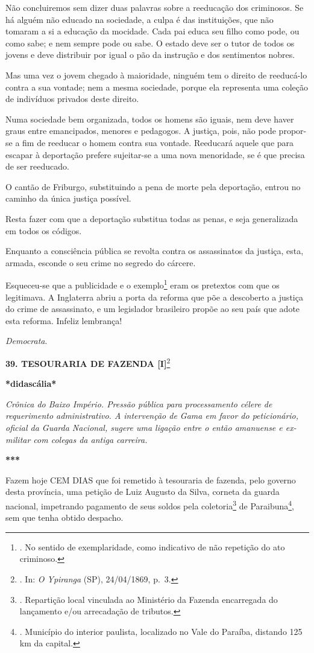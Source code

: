 Não concluiremos sem dizer duas palavras sobre a reeducação dos
criminosos. Se há alguém não educado na sociedade, a culpa é das
instituições, que não tomaram a si a educação da mocidade. Cada pai
educa seu filho como pode, ou como sabe; e nem sempre pode ou sabe. O
estado deve ser o tutor de todos os jovens e deve distribuir por igual o
pão da instrução e dos sentimentos nobres.

Mas uma vez o jovem chegado à maioridade, ninguém tem o direito de
reeducá-lo contra a sua vontade; nem a mesma sociedade, porque ela
representa uma coleção de indivíduos privados deste direito.

Numa sociedade bem organizada, todos os homens são iguais, nem deve
haver graus entre emancipados, menores e pedagogos. A justiça, pois, não
pode propor-se a fim de reeducar o homem contra sua vontade. Reeducará
aquele que para escapar à deportação prefere sujeitar-se a uma nova
menoridade, se é que precisa de ser reeducado.

O cantão de Friburgo, substituindo a pena de morte pela deportação,
entrou no caminho da única justiça possível.

Resta fazer com que a deportação substitua todas as penas, e seja
generalizada em todos os códigos.

Enquanto a consciência pública se revolta contra os assassinatos da
justiça, esta, armada, esconde o seu crime no segredo do cárcere.

Esqueceu-se que a publicidade e o exemplo\footnote{. No sentido de
  exemplaridade, como indicativo de não repetição do ato criminoso.}
eram os pretextos com que os legitimava. A Inglaterra abriu a porta da
reforma que põe a descoberto a justiça do crime de assassinato, e um
legislador brasileiro propõe ao seu país que adote esta reforma. Infeliz
lembrança!

\emph{Democrata}.

\textbf{39. TESOURARIA DE FAZENDA {[}I{]}}\footnote{. In: \emph{O
  Ypiranga} (SP), 24/04/1869, p.~3.}

\textbf{*didascália*}

\emph{Crônica do Baixo Império. Pressão pública para processamento
célere de requerimento administrativo. A intervenção de Gama em favor do
peticionário, oficial da Guarda Nacional, sugere uma ligação entre o
então amanuense e ex-militar com colegas da antiga carreira.}

\textbf{***}

Fazem hoje CEM DIAS que foi remetido à tesouraria de fazenda, pelo
governo desta província, uma petição de Luiz Augusto da Silva, corneta
da guarda nacional, impetrando pagamento de seus soldos pela
coletoria\footnote{. Repartição local vinculada ao Ministério da Fazenda
  encarregada do lançamento e/ou arrecadação de tributos.} de
Paraibuna\footnote{. Município do interior paulista, localizado no Vale
  do Paraíba, distando 125 km da capital.}, sem que tenha obtido
despacho.

